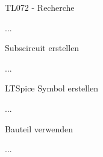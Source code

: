 \begin{frame}[t]{TL072 - Recherche} 

    ...
\end{frame}

\begin{frame}[t]{Subscircuit erstellen} 

    ...
\end{frame}

\begin{frame}[t]{LTSpice Symbol erstellen} 

    ...
\end{frame}

\begin{frame}[t]{Bauteil verwenden} 

    ...
\end{frame}